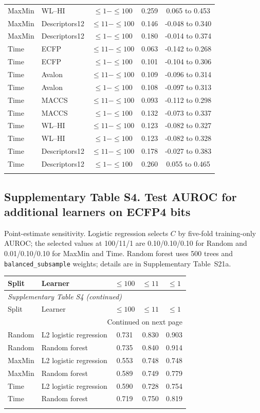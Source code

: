 \begin{longtable}{llccc}
MaxMin & WL--HI & $\leq1-\leq100$ & 0.259 & 0.065 to 0.453 \\
MaxMin & Descriptors12 & $\leq11-\leq100$ & 0.146 & -0.048 to 0.340 \\
MaxMin & Descriptors12 & $\leq1-\leq100$ & 0.180 & -0.014 to 0.374 \\
\addlinespace
Time & ECFP & $\leq11-\leq100$ & 0.063 & -0.142 to 0.268 \\
Time & ECFP & $\leq1-\leq100$ & 0.101 & -0.104 to 0.306 \\
Time & Avalon & $\leq11-\leq100$ & 0.109 & -0.096 to 0.314 \\
Time & Avalon & $\leq1-\leq100$ & 0.108 & -0.097 to 0.313 \\
Time & MACCS & $\leq11-\leq100$ & 0.093 & -0.112 to 0.298 \\
Time & MACCS & $\leq1-\leq100$ & 0.132 & -0.073 to 0.337 \\
Time & WL--HI & $\leq11-\leq100$ & 0.123 & -0.082 to 0.327 \\
Time & WL--HI & $\leq1-\leq100$ & 0.123 & -0.082 to 0.328 \\
Time & Descriptors12 & $\leq11-\leq100$ & 0.178 & -0.027 to 0.383 \\
Time & Descriptors12 & $\leq1-\leq100$ & 0.260 & 0.055 to 0.465 \\
\addlinespace
\end{longtable}

\subsection*{Supplementary Table S4. Test AUROC for additional learners on ECFP4 bits}
Point-estimate sensitivity. Logistic regression selects $C$ by five-fold training-only AUROC; the selected values at 100/11/1 are 0.10/0.10/0.10 for Random and 0.01/0.10/0.10 for MaxMin and Time. Random forest uses 500 trees and \texttt{balanced\_subsample} weights; details are in Supplementary Table~S21a.
\begin{longtable}{llccc}

\toprule Split & Learner & $\leq100$ & $\leq11$ & $\leq1$ \\ \midrule\endfirsthead
\multicolumn{5}{l}{\textit{Supplementary Table S4 (continued)}} \\
\toprule Split & Learner & $\leq100$ & $\leq11$ & $\leq1$ \\ \midrule\endhead
\midrule\multicolumn{5}{r}{Continued on next page}\\\endfoot
\bottomrule\endlastfoot
Random & L2 logistic regression & 0.731 & 0.830 & 0.903 \\
Random & Random forest & 0.735 & 0.840 & 0.914 \\
\addlinespace
MaxMin & L2 logistic regression & 0.553 & 0.748 & 0.748 \\
MaxMin & Random forest & 0.589 & 0.749 & 0.779 \\
\addlinespace
Time & L2 logistic regression & 0.590 & 0.728 & 0.754 \\
Time & Random forest & 0.719 & 0.750 & 0.819 \\
\addlinespace
\end{longtable}

